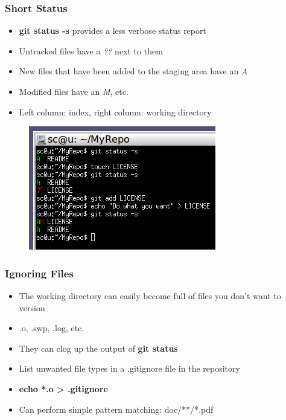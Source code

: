 \documentclass{beamer}
\begin{document}
\begin{frame}
	\frametitle{Short Status}
	\begin{itemize}
		\item{\textbf{git status -s} provides a less verbose status report}
		\item{Untracked files have a \textit{??} next to them}
		\item{New files that have been added to the staging area have an \textit{A}}
		\item{Modified files have an \textit{M}, etc.}
		\item{Left column: index, right column: working directory}
	\end{itemize}
	\begin{figure}
		\includegraphics[scale=0.63]{Short_Status-0.png}
	\end{figure}
\end{frame}

\begin{frame}
	\frametitle{Ignoring Files}
	\begin{itemize}
		\item{The working directory can easily become full of files you don't want to version}
		\item{.o, .swp, .log, etc.}
		\item{They can clog up the output of \textbf{git status}}
		\item{List unwanted file types in a .gitignore file in the repository}
		\item{\textbf{echo *.o \textgreater{} .gitignore}}
		\item{Can perform simple pattern matching: doc/**/*.pdf}
	\end{itemize}
\end{frame}
\end{document}
